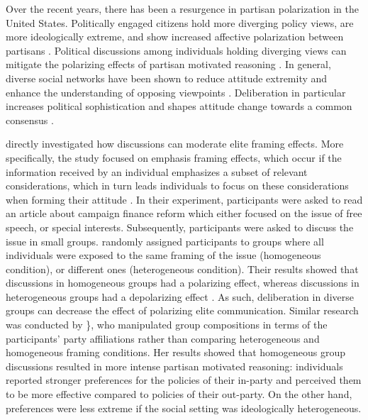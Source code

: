 \documentclass[11pt,]{article}
\begin{document}
Over the recent years, there has been a resurgence in partisan
polarization in the United States. Politically engaged citizens hold
more diverging policy views, are more ideologically extreme, and show
increased affective polarization between partisans
\citep{hetherington2001resurgent, abramowitz2008polarization, iyengar2012affect, mason2014disrespectfully, huddy2015expressive, iyengar2015fear}.
Political discussions among individuals holding diverging views can
mitigate the polarizing effects of partisan motivated reasoning
\citep[see also][]{mendelberg2002deliberative, eveland2011beyond}. In
general, diverse social networks have been shown to reduce attitude
extremity \citep{levitan2009social} and enhance the understanding of
opposing viewpoints \citep{mutz2002cross}. Deliberation in particular
increases political sophistication \citep{gastil1999increasing} and
shapes attitude change towards a common consensus
\citep{vinokur1978depolarization, barabas2004deliberation}.

\citet{druckman2003framing} directly investigated how discussions can
moderate elite framing effects. More specifically, the study focused on
emphasis framing effects, which occur if the information received by an
individual emphasizes a subset of relevant considerations, which in turn
leads individuals to focus on these considerations when forming their
attitude \citep[c.f.][]{druckman2001implications}. In their experiment,
participants were asked to read an article about campaign finance reform
which either focused on the issue of free speech, or special interests.
Subsequently, participants were asked to discuss the issue in small
groups. \citet{druckman2003framing} randomly assigned participants to
groups where all individuals were exposed to the same framing of the
issue (homogeneous condition), or different ones (heterogeneous
condition). Their results showed that discussions in homogeneous groups
had a polarizing effect, whereas discussions in heterogeneous groups had
a depolarizing effect \citep[see also][]{druckman2004political}. As
such, deliberation in diverse groups can decrease the effect of
polarizing elite communication. Similar research was conducted by
\citet{klar2014partisanship}\}, who manipulated group compositions in
terms of the participants' party affiliations rather than comparing
heterogeneous and homogeneous framing conditions. Her results showed
that homogeneous group discussions resulted in more intense partisan
motivated reasoning: individuals reported stronger preferences for the
policies of their in-party and perceived them to be more effective
compared to policies of their out-party. On the other hand, preferences
were less extreme if the social setting was ideologically heterogeneous.
\end{document}
